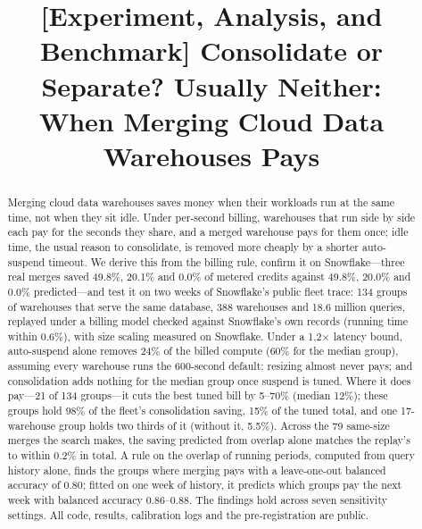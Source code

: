 \documentclass[conference]{IEEEtran}
\begin{document}
\title{[Experiment, Analysis, and Benchmark] Consolidate or Separate? Usually Neither:\\When Merging Cloud Data Warehouses Pays}

\author{
\and
{}
}

\maketitle

\begin{abstract}
Merging cloud data warehouses saves money when their workloads run at the same time, not when they sit idle. Under
per-second billing, warehouses that run side by side each pay for the seconds they share, and a merged warehouse pays for
them once; idle time, the usual reason to consolidate, is removed more cheaply by a shorter auto-suspend timeout. We derive
this from the billing rule, confirm it on Snowflake---three real merges saved 49.8\%, 20.1\% and 0.0\% of metered
credits against 49.8\%, 20.0\% and 0.0\% predicted---and test it on two weeks of Snowflake's public fleet trace: 134 groups of warehouses that serve
the same database, 388 warehouses and 18.6 million queries, replayed under a billing model checked against Snowflake's own
records (running time within 0.6\%), with size scaling measured on Snowflake. Under a 1.2$\times$ latency bound,
auto-suspend alone removes 24\% of the billed compute (60\% for the median group), assuming every warehouse runs the
600-second default; resizing almost never pays; and consolidation adds nothing for the median group once suspend is tuned.
Where it does pay---21 of 134 groups---it cuts the best tuned bill by 5--70\% (median 12\%); these groups hold 98\% of the
fleet's consolidation saving, 15\% of the tuned total, and one 17-warehouse group holds two thirds of it (without it, 5.5\%). Across the 79 same-size merges the search makes,
the saving predicted from overlap alone matches the replay's to within 0.2\% in total. A rule
on the overlap of running periods, computed from query history alone, finds the groups where merging pays with a
leave-one-out balanced accuracy of 0.80; fitted on one week of history, it predicts which groups pay the next week with
balanced accuracy 0.86--0.88. The findings hold across seven sensitivity settings. All code, results,
calibration logs and the pre-registration are public.
\end{abstract}
\end{document}
